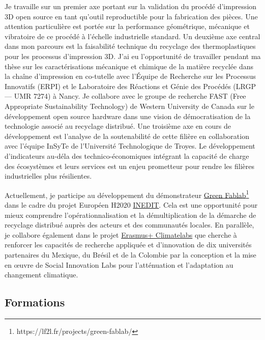 \documentclass[
  11pt,
]{article}
\begin{document}
Je travaille sur un premier axe portant sur la validation du procédé
d'impression 3D open source en tant qu'outil reproductible pour la
fabrication des pièces. Une attention particulière est portée sur la
performance géométrique, mécanique et vibratoire de ce procédé à
l'échelle industrielle standard. Un deuxième axe central dans mon
parcours est la faisabilité technique du recyclage des thermoplastiques
pour les processus d'impression 3D. J'ai eu l'opportunité de travailler
pendant ma thèse sur les caractérisations mécanique et chimique de la
matière recyclée dans la chaîne d'impression en co-tutelle avec l'Équipe
de Recherche sur les Processus Innovatifs (ERPI) et le Laboratoire des
Réactions et Génie des Procédés (LRGP --- UMR 7274) à Nancy. Je
collabore avec le groupe de recherche FAST (Free Appropriate
Sustainability Technology) de Western University de Canada sur le
développement open source hardware dans une vision de démocratisation de
la technologie associé au recyclage distribué. Une troisième axe en
cours de développement est l'analyse de la soutenabilité de cette
filière en collaboration avec l'équipe InSyTe de l'Université
Technologique de Troyes. Le développement d'indicateurs au-déla des
technico-économiques intégrant la capacité de charge des écosystèmes et
leurs services est un enjeu prometteur pour rendre les filières
industrielles plus résilientes.

Actuellement, je participe au développement du démonstrateur
\href{https://lf2l.fr/projects/green-fablab/}{Green Fablab}\footnote{https://lf2l.fr/projects/green-fablab/}
dans le cadre du projet Européen H2020
\href{http://erpi.univ-lorraine.fr/projects/INEDIT/}{INEDIT}. Cela est
une opportunité pour mieux comprendre l'opérationnalisation et la
démultiplication de la démarche de recyclage distribué auprès des
acteurs et des communautés locales. En parallèle, je collabore également
dans le projet
\href{https://erpi.univ-lorraine.fr/fr/projects/Climatelabs/}{Erasmus+
Climatelabs} que cherche à renforcer les capacités de recherche
appliquée et d'innovation de dix universités partenaires du Mexique, du
Brésil et de la Colombie par la conception et la mise en œuvre de Social
Innovation Labs pour l'atténuation et l'adaptation au changement
climatique.

\hypertarget{formations}{%
\subsection{Formations}\label{formations}}
\end{document}
